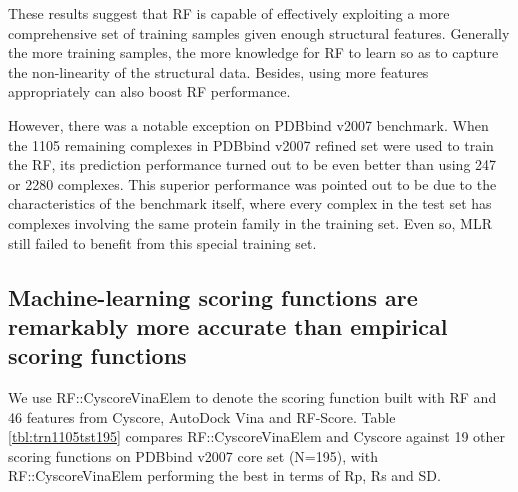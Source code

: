 \documentclass[journal=jacsat,manuscript=article]{achemso}
\begin{document}
These results suggest that RF is capable of effectively exploiting a more comprehensive set of training samples given enough structural features. Generally the more training samples, the more knowledge for RF to learn so as to capture the non-linearity of the structural data. Besides, using more features appropriately can also boost RF performance.

However, there was a notable exception on PDBbind v2007 benchmark. When the 1105 remaining complexes in PDBbind v2007 refined set were used to train the RF, its prediction performance turned out to be even better than using 247 or 2280 complexes. This superior performance was pointed out \cite{774} to be due to the characteristics of the benchmark itself, where every complex in the test set has complexes involving the same protein family in the training set. Even so, MLR still failed to benefit from this special training set.

\subsection{Machine-learning scoring functions are remarkably more accurate than empirical scoring functions}

We use RF::CyscoreVinaElem to denote the scoring function built with RF and 46 features from Cyscore, AutoDock Vina and RF-Score. Table \ref{tbl:trn1105tst195} compares RF::CyscoreVinaElem and Cyscore against 19 other scoring functions on PDBbind v2007 core set (N=195), with RF::CyscoreVinaElem performing the best in terms of Rp, Rs and SD.
\end{document}

